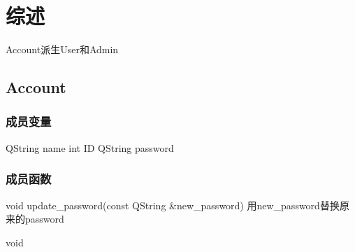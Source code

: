 \section{综述}
    Account派生User和Admin
    
\subsection{Account}
    \subsubsection{成员变量}
    QString name
    int ID
    QString password

    \subsubsection{成员函数}
    void update_password(const QString &new_password)
    用new_password替换原来的password
    
    void 